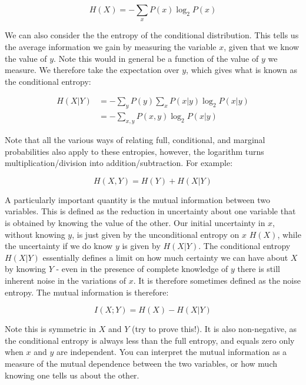 \documentclass{article}
\begin{document}
\begin{equation*}
	H(X) = -\sum_x P(x) \log_2P(x)
\end{equation*}

We can also consider the the entropy of the conditional distribution. This tells us the average information we gain by measuring the variable $x$, given that we know the value of $y$. Note this would in general be a function of the value of $y$ we measure. We therefore take the expectation over $y$, which gives what is known as the conditional entropy:

\begin{align*}
	H(X|Y) & = -\sum_{y} P(y) \sum_x P(x|y) \log_2P(x|y) \\
	       & = -\sum_{x,y} P(x,y) \log_2P(x|y)
\end{align*}

Note that all the various ways of relating full, conditional, and marginal probabilities also apply to these entropies, however, the logarithm turns multiplication/division into addition/subtraction. For example:

\begin{equation*}
	H(X,Y) = H(Y) + H(X|Y)
\end{equation*}

A particularly important quantity is the mutual information between two variables. This is defined as the reduction in uncertainty about one variable that is obtained by knowing the value of the other. Our initial uncertainty in $x$, without knowing $y$, is just given by the unconditional entropy on $x$ $H(X)$, while the uncertainty if we do know $y$ is given by $H(X|Y)$. The conditional entropy $H(X|Y)$ essentially defines a limit on how much certainty we can have about $X$ by knowing $Y$ - even in the presence of complete knowledge of $y$ there is still inherent noise in the variations of $x$. It is therefore sometimes defined as the noise entropy. The mutual information is therefore:

\begin{equation*}
	I(X;Y) = H(X) - H(X|Y)
\end{equation*}

Note this is symmetric in $X$ and $Y$ (try to prove this!). It is also non-negative, as the conditional entropy is always less than the full entropy, and equals zero only when $x$ and $y$ are independent. You can interpret the mutual information as a measure of the mutual dependence between the two variables, or how much knowing one tells us about the other.\\
\end{document}
